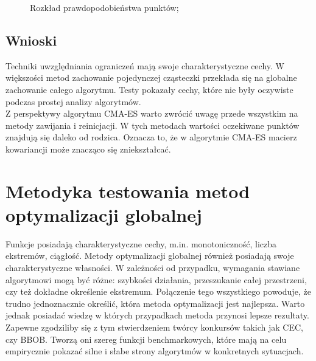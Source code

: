 \documentclass{mini}
\begin{document}
\begin{figure}[H]
\centering
{}
\quad
{}
\caption{Rozkład prawdopodobieństwa punktów;}
\end{figure}

\subsection{Wnioski}
Techniki uwzględniania ograniczeń mają swoje charakterystyczne cechy. W większości metod zachowanie pojedynczej cząsteczki przekłada się na globalne zachowanie całego algorytmu. Testy pokazały cechy, które nie były oczywiste podczas prostej analizy algorytmów.\\
Z perspektywy algorytmu CMA-ES warto zwrócić uwagę przede wszystkim na metody zawijania i reinicjacji. W tych metodach wartości oczekiwane punktów znajdują się daleko od rodzica. Oznacza to, że w algorytmie CMA-ES macierz kowariancji może znacząco się zniekształcać.

\pagebreak

\section{Metodyka testowania metod optymalizacji globalnej}
Funkcje posiadają charakterystyczne cechy, m.in. monotoniczność, liczba ekstremów, ciągłość. Metody optymalizacji globalnej również posiadają swoje charakterystyczne własności. W zależności od przypadku, wymagania stawiane algorytmowi mogą być różne: szybkości działania, przeszukanie całej przestrzeni, czy też dokładne określenie ekstremum. Połączenie tego wszystkiego powoduje, że trudno jednoznacznie określić, która metoda optymalizacji jest najlepsza. Warto jednak posiadać wiedzę w których przypadkach metoda przynosi lepsze rezultaty.\\
Zapewne zgodziliby się z tym stwierdzeniem twórcy konkursów takich jak CEC, czy BBOB. Tworzą oni szereg funkcji benchmarkowych, które mają na celu empirycznie pokazać silne i słabe strony algorytmów w konkretnych sytuacjach.
\end{document}
